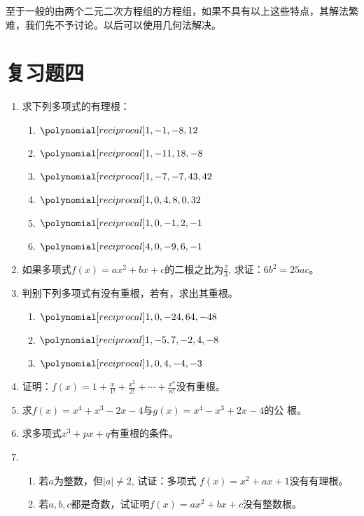至于一般的由两个二元二次方程组的方程组，如果不具有以上这些特点，其解法繁难，我们先不予讨论。以后可以使用几何法解决。


\section*{复习题四}
\begin{enumerate}
    \item 求下列多项式的有理根：
\begin{multicols}{2}
\begin{enumerate}
    \item $\poly{1,-1,-8,12}$
    \item $\poly{1,-11,18,-8}$
    \item $\poly{1,-7,-7,43,42}$
    \item $\poly{1,0,4,8,0,32}$
    \item $\poly{1,0,-1,2,-1}$
    \item $\poly{4,0,-9,6,-1}$
\end{enumerate}
\end{multicols}

\item 如果多项式$f(x)=ax^2+bx+c$的二根之比为$\frac{2}{3}$, 求证：$6b^2=25ac$。

\item 判别下列多项式有没有重根，若有，求出其重根。
\begin{enumerate}
    \item $\poly{1,0,-24,64,-48}$
    \item $\poly{1,-5,7,-2,4,-8}$
    \item $\poly{1,0,4,-4,-3}$
\end{enumerate}

\item 证明：$f(x)=1+\frac{x}{1!}+\frac{x^2}{2!}+\cdots+\frac{x^n}{n!}$没有重根。

\item 求$f(x)=x^4+x^3-2x-4$与$g(x)=x^4-x^3+2x-4$的公
根。

\item 求多项式$x^3+px+q$有重根的条件。

\item \begin{enumerate}
    \item 若$a$为整数，但$|a|\ne 2$, 试证：多项式
$f (x) =x^2+ax+1$没有有理根。
\item 若$a,b,c$都是奇数，试证明$f(x)=ax^2+bx+c$没有整数根。
\end{enumerate}



\end{enumerate}
